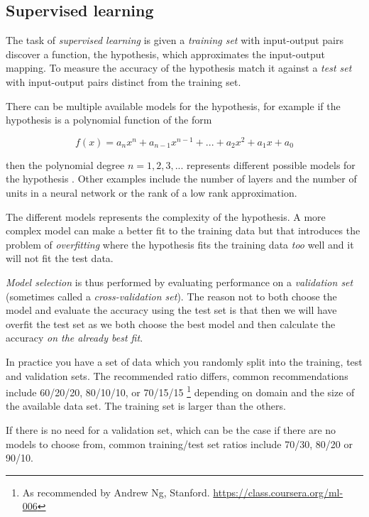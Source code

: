 
\subsection{Supervised learning}\label{sec:background:theory:suplearn}

The task of \textit{supervised learning} is given a \textit{training set} with input-output pairs discover a function, the hypothesis, which approximates the input-output mapping.  To measure the accuracy of the hypothesis match it against a \textit{test set} with input-output pairs distinct from the training set.
\citep{norvigAI}

There can be multiple available models for the hypothesis, for example if the hypothesis is a polynomial function of the form 

\begin{equation}
f(x) = a_n x^n + a_{n - 1} x^{n - 1} + ... + a_2 x^2 + a_1 x + a_0
\end{equation}

then the polynomial degree $n = 1, 2, 3, ...$ represents different possible models for the hypothesis \citep{norvigAI}. Other examples include the number of layers and the number of units in a neural network or the rank of a low rank approximation.

The different models represents the complexity of the hypothesis. A more complex model can make a better fit to the training data but that introduces the problem of \textit{overfitting} where the hypothesis fits the training data \textit{too} well and it will not fit the test data.
\citep{norvigAI}

\textit{Model selection} is thus performed by evaluating performance on a \textit{validation set} (sometimes called a \textit{cross-validation set}). The reason not to both choose the model and evaluate the accuracy using the test set is that then we will have overfit the test set as we both choose the best model and then calculate the accuracy \textit{on the already best fit}.
\citep{norvigAI}

In practice you have a set of data which you randomly split into the training, test and validation sets. The recommended ratio differs, common recommendations include 60/20/20, 80/10/10, or 70/15/15 \footnote{As recommended by Andrew Ng, Stanford. \url{https://class.coursera.org/ml-006}} depending on domain and the size of the available data set. The training set is larger than the others.

If there is no need for a validation set, which can be the case if there are no models to choose from, common training/test set ratios include 70/30, 80/20 \cite{hu2008collaborative} or 90/10.


